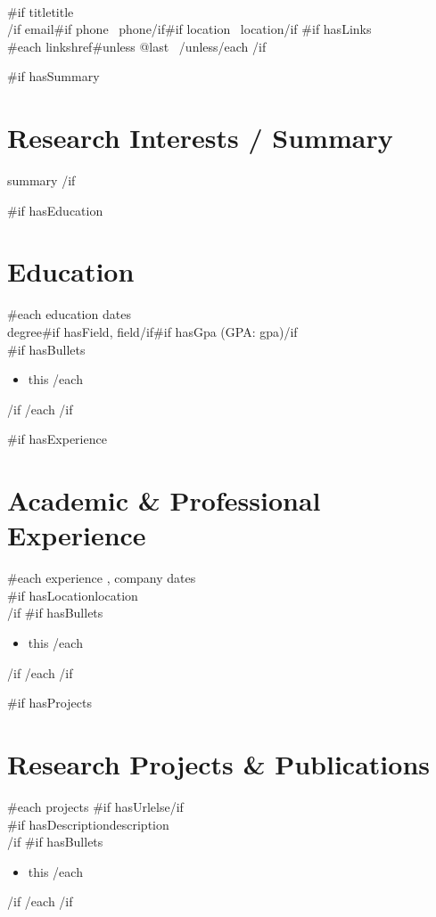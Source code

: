 \documentclass[11pt,a4paper]{article}
\begin{document}
\begin{center}
  {\LARGE {}\relax{}}\\[3pt]
  {{#if title}}{{title}}\\[3pt]
  {{/if}}
  {{email}}{{#if phone}} \textbullet\ {{phone}}{{/if}}{{#if location}} \textbullet\ {{location}}{{/if}}
  {{#if hasLinks}}\\
  {{#each links}}{{href}}{{#unless @last}} \textbullet\ {{/unless}}{{/each}}
  {{/if}}
\end{center}

{{#if hasSummary}}
\section*{Research Interests / Summary}
{{summary}}
{{/if}}

{{#if hasEducation}}
\section*{Education}
{{#each education}}
\textbf{\relax{}} \hfill {{dates}}\\
{{degree}}{{#if hasField}}, {{field}}{{/if}}{{#if hasGpa}} (GPA: {{gpa}}){{/if}}\\
{{#if hasBullets}}
\begin{itemize}
{{#each bullets}}\item {{this}}
{{/each}}
\end{itemize}
{{/if}}
{{/each}}
{{/if}}

{{#if hasExperience}}
\section*{Academic \& Professional Experience}
{{#each experience}}
\textbf{\relax{}}, {{company}} \hfill {{dates}}\\
{{#if hasLocation}}{{location}}\\
{{/if}}
{{#if hasBullets}}
\begin{itemize}
{{#each bullets}}\item {{this}}
{{/each}}
\end{itemize}
{{/if}}
{{/each}}
{{/if}}

{{#if hasProjects}}
\section*{Research Projects \& Publications}
{{#each projects}}
{{#if hasUrl}}\textbf{\relax{}}{{else}}\textbf{\relax{}}{{/if}}\\
{{#if hasDescription}}{{description}}\\
{{/if}}
{{#if hasBullets}}
\begin{itemize}
{{#each bullets}}\item {{this}}
{{/each}}
\end{itemize}
{{/if}}
{{/each}}
{{/if}}
\end{document}
